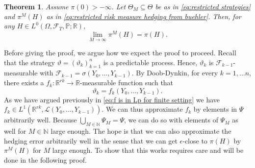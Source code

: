 \documentclass[11pt,a4paper,twoside,openany]{report}
\numberwithin{equation}{section}
\theoremstyle{plain} %
\newtheorem{theorem}{Theorem}[section]
\theoremstyle{definition} %
\theoremstyle{remark} %
\begin{document}
\begin{theorem}\label{thm:approximation by restricted hedging errors}
Assume \(\pi(0)>-\infty\).
 Let \(\Theta_M\subseteq \Theta\) be as in \eqref{eq:restricted strategies} and \(\pi^M(H)\) as in \eqref{eq:restricted risk measure hedging from buehler}. Then, for any \(H\in L^0(\Omega,\mathcal{F}_T,\mathbb{P};\mathbb{R})\),
 \begin{equation*}
     \lim_{M\to\infty}\pi^M(H)=\pi(H).
 \end{equation*}
\end{theorem}
Before giving the proof, we argue how we expect the proof to proceed. Recall that the strategy \(\vartheta=(\vartheta_k)_{k=1}^n\) is a predictable process. Hence, \(\vartheta_k\) is \(\mathcal{F}_{k-1}\)-measurable with \newline \(\mathcal{F}_{k-1}=\sigma(Y_0,\dots,Y_{k-1})\). By Doob-Dynkin, for every \(k=1,\dots n\), there exists a \newline\(f_k:\mathbb{R}^{rk}\to\mathbb{R}\)-measurable function such that
\begin{equation*}
    \vartheta_k=f_k(Y_0,\dots,Y_{k-1}).
\end{equation*}
As we have argued previously in \eqref{eq:f is in Lp for finite setting} we have \(f_k\in L^1(\mathbb{R}^{rk},\mathcal{L}(Y_0,\dots,Y_{k-1}))\). We can thus approximate \(f_k\) by elements in \(\Psi\) arbitrarily well. Because \(\bigcup_{M\in\mathbb{N}}\Psi_M=\Psi\), we can do so with elements of \(\Psi_M\) as well for \(M\in\mathbb{N}\) large enough. The hope is that we can also approximate the hedging error arbitrarily well in the sense that we can get \(\epsilon\)-close to \(\pi(H)\) by \(\pi^M(H)\) for \(M\) large enough. To show that this works requires care and will be done in the following proof.
\end{document}
